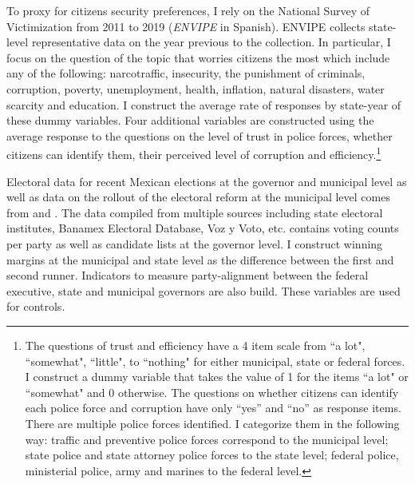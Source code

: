 \documentclass[12pt]{amsart}
\numberwithin{equation}{section}
\theoremstyle{definition}
\theoremstyle{definition}
\theoremstyle{definition}
\begin{document}
To proxy for citizens security preferences, I rely on the National Survey of Victimization from 2011 to 2019 (\emph{ENVIPE} in Spanish). ENVIPE collects state-level representative data on the year previous to the collection.  In particular, I focus on the question of the topic that worries citizens the most which include any of the following: narcotraffic, insecurity, the punishment of criminals, corruption, poverty, unemployment, health, inflation, natural disasters, water scarcity and education. I construct the average rate of responses by state-year of these dummy variables. Four additional variables are constructed using the average response to the questions on the level of trust in police forces, whether citizens can identify them, their perceived level of corruption and efficiency.\footnote{The questions of trust and efficiency have a 4 item scale from ``a lot", ``somewhat", ``little", to  ``nothing" for either municipal, state or federal forces. I construct a dummy variable that takes the value of 1 for the items ``a lot" or ``somewhat" and 0 otherwise. The questions on whether citizens can identify each police force and corruption have only ``yes'' and ``no'' as response items. There are multiple police forces identified. I categorize them in the following way: traffic and preventive police forces correspond to the municipal level; state police and state attorney police forces to the state level; federal police, ministerial police, army and marines to the federal level.} 
 
Electoral data for recent Mexican elections at the governor and municipal level as well as data on the rollout of the electoral reform at the municipal level comes from \citet{magar_2012} and \citet{magar_2017}. The data compiled from multiple sources including state electoral institutes, Banamex Electoral Database, Voz y Voto, etc. contains voting counts per party as well as candidate lists at the governor level. I construct winning margins at the municipal and state level as the difference between the first and second runner.  Indicators to measure party-alignment between the federal executive, state and municipal governors are also build. These variables are used for controls. 
\end{document}
